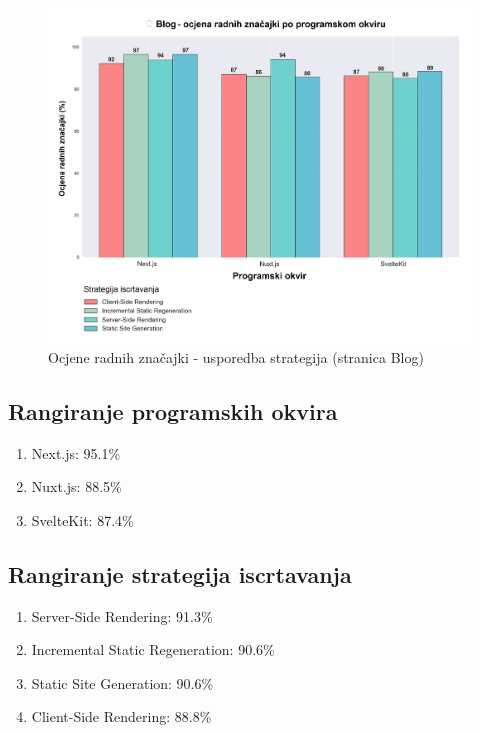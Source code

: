 \begin{figure}[H]
    \centering
    \includegraphics[width=\textwidth]{slike/rezultati/blog/blog_strategy_comparison.png}
    \caption{Ocjene radnih značajki - usporedba strategija (stranica Blog)}
    \label{fig:testiranje-blog-usporedba-strategija}
\end{figure}

\newpage

\subsection{Rangiranje programskih okvira}
\begin{enumerate}
    \item Next.js: 95.1\%
    \item Nuxt.js: 88.5\%
    \item SvelteKit: 87.4\%
\end{enumerate}

\subsection{Rangiranje strategija iscrtavanja}
\begin{enumerate}
    \item Server-Side Rendering: 91.3\%
    \item Incremental Static Regeneration: 90.6\%
    \item Static Site Generation: 90.6\%
    \item Client-Side Rendering: 88.8\%
\end{enumerate}

